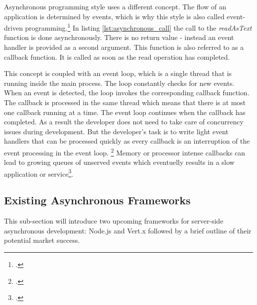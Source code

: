 Asynchronous programming style uses a different concept. The flow of an
application is determined by events, which is why this style is also called
event-driven programming.\footcite[Cf.][16]{teixeira_2012} In listing \ref{lst:asynchronous_call} the call
to the \textit{readAsText} function is done asynchronously. There is no
return value - instead an event handler is provided as a second argument.
This function is also referred to as a callback function. It is called
as soon as the read operation has completed.



This concept is coupled with an event loop, which is a single thread that is
running inside the main process.
The loop constantly checks for new events. When an event is detected, the loop
invokes the corresponding callback function. The callback is processed in the
same thread which means that there is at most one callback running at a time.
The event loop continues when the callback has completed. As a result the
developer does not need to take care of concurrency issues during development.
But the developer's task is to write light event handlers that can be processed
quickly as every callback is an interruption of the event processing in the
event loop. \footcite[Cf.][]{Croucher_2010} Memory or processor intense callbacks
can lead to growing queues of unserved events which eventuelly results
in a slow application or service\footcite[Cf.][48]{teixeira_2012}.





\subsection{Existing Asynchronous Frameworks}
\label{existing_frameworks}
This sub-section will introduce two upcoming frameworks for server-side asynchronous development: Node.js and Vert.x followed by a brief outline of their potential market success.

